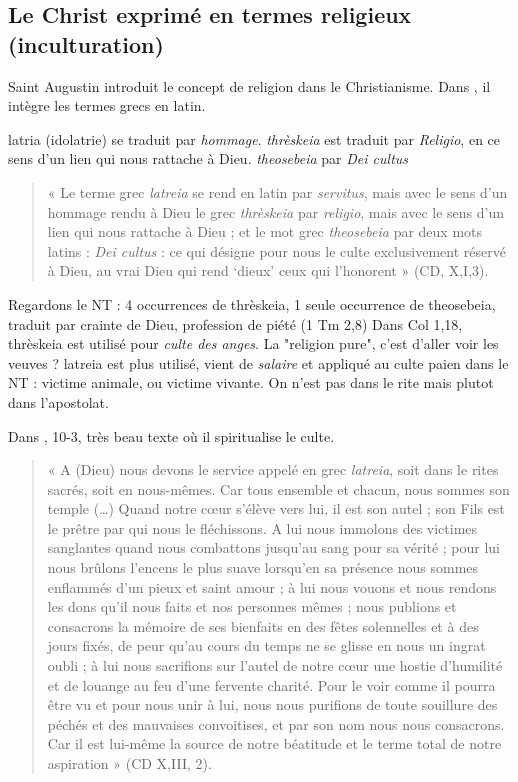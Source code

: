   \subsection{Le Christ exprimé en termes religieux (inculturation)}
  
  Saint Augustin introduit le concept de religion dans le Christianisme. Dans , il intègre les termes grecs en latin.
  
  latria (idolatrie) se traduit par \textit{hommage}. \textit{thrèskeia} est traduit par \textit{Religio}, en ce sens d'un lien qui nous rattache à Dieu. \textit{theosebeia} par \textit{Dei cultus}
  
  \begin{quote}
    « Le terme grec \textit{latreia} se rend en latin par \textit{servitus}, mais avec le sens d’un hommage rendu à Dieu  le grec \textit{thrèskeia} par \textit{religio}, mais avec le sens d’un lien qui nous rattache à Dieu ; et le mot grec \textit{theosebeia} par deux mots latins :\textit{ Dei cultus} : ce qui désigne pour nous le culte exclusivement réservé à Dieu, au vrai Dieu qui rend ‘dieux’ ceux qui l’honorent » (CD, X,I,3). 
\end{quote}



Regardons le NT : 
4 occurrences de thrèskeia, 1 seule occurrence de theosebeia, traduit par crainte de Dieu, profession de piété (1 Tm 2,8)
Dans Col 1,18, thrèskeia est utilisé pour \textit{culte des anges}. La "religion pure", c'est d'aller voir les veuves ? 
latreia est plus utilisé, vient de \textit{salaire} et appliqué au culte paien dans le NT : victime animale, ou victime vivante. On n'est pas dans le rite mais plutot dans l'apostolat.

Dans \CD, 10-3, très beau texte où il spiritualise le culte.

\begin{quote}
    « A (Dieu) nous devons le service appelé en grec \textit{latreia}, soit dans le rites sacrés, soit en nous-mêmes. Car tous ensemble et chacun, nous sommes son temple (…) Quand notre cœur s’élève vers lui, il est son autel ; son Fils est le prêtre par qui nous le fléchissons. A lui nous immolons des victimes sanglantes quand nous combattons jusqu’au sang pour sa vérité ; pour lui nous brûlons l’encens le plus suave lorsqu’en sa présence nous sommes enflammés d’un pieux et saint amour ; à lui nous vouons et nous rendons les dons qu’il nous faits et nos personnes mêmes ; nous publions et consacrons la mémoire de ses bienfaits en des fêtes solennelles et à des jours fixés, de peur qu’au cours du temps ne se glisse en nous un ingrat oubli ; à lui nous sacrifions sur l’autel de notre cœur une hostie d’humilité et de louange au feu d’une fervente charité. Pour le voir comme il pourra être vu et pour nous unir à lui, nous nous purifions de toute souillure des péchés et des mauvaises convoitises, et par son nom nous nous consacrons. Car il est lui-même la source de notre béatitude et le terme total de notre aspiration » (CD X,III, 2). 
\end{quote}  
  
